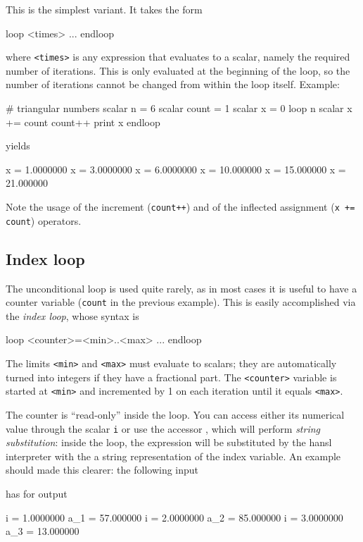 This is the simplest variant. It takes the form
\begin{code}
loop <times>
   ...
endloop
\end{code}
where \texttt{<times>} is any expression that evaluates to a scalar,
namely the required number of iterations. This is only evaluated at
the beginning of the loop, so the number of iterations cannot be
changed from within the loop itself. Example:
\begin{code}
# triangular numbers
scalar n = 6
scalar count = 1
scalar x = 0
loop n
    scalar x += count
    count++
    print x
endloop
\end{code}
yields
\begin{code}
              x =  1.0000000
              x =  3.0000000
              x =  6.0000000
              x =  10.000000
              x =  15.000000
              x =  21.000000
\end{code}

Note the usage of the increment (\texttt{count++}) and of the
inflected assignment (\texttt{x += count}) operators.

\subsection{Index loop}

The unconditional loop is used quite rarely, as in most cases it is
useful to have a counter variable (\texttt{count} in the previous
example). This is easily accomplished via the \emph{index loop}, whose
syntax is
\begin{code}
loop <counter>=<min>..<max>
   ...
endloop
\end{code}
The limits \texttt{<min>} and \texttt{<max>} must evaluate to scalars;
they are automatically turned into integers if they have a fractional
part. The \texttt{<counter>} variable is started at \texttt{<min>} and
incremented by 1 on each iteration until it equals \texttt{<max>}.

The counter is ``read-only'' inside the loop. You can access either
its numerical value through the scalar \texttt{i} or use the accessor
, which will perform \emph{string substitution}: inside the
loop, the expression  will be substituted by the hansl
interpreter with the a string representation of the index variable. An
example should made this clearer: the following input
has for output
\begin{code}
    i = 1.0000000
  a_1 = 57.000000
    i = 2.0000000
  a_2 = 85.000000
    i = 3.0000000
  a_3 = 13.000000
\end{code}

